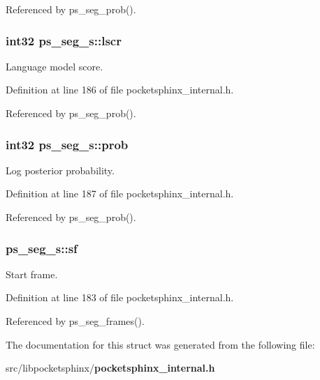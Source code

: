 Referenced by ps\-\_\-seg\-\_\-prob().

\subsubsection[{lscr}]{\setlength{\rightskip}{0pt plus 5cm}int32 ps\-\_\-seg\-\_\-s\-::lscr}\label{structps__seg__s_a69e605f422eeed1a9c67437e8ddd8b08}


Language model score. 



Definition at line 186 of file pocketsphinx\-\_\-internal.\-h.



Referenced by ps\-\_\-seg\-\_\-prob().

\subsubsection[{prob}]{\setlength{\rightskip}{0pt plus 5cm}int32 ps\-\_\-seg\-\_\-s\-::prob}\label{structps__seg__s_ae683244d90d0a5339930b47757778432}


Log posterior probability. 



Definition at line 187 of file pocketsphinx\-\_\-internal.\-h.



Referenced by ps\-\_\-seg\-\_\-prob().

\subsubsection[{sf}]{ ps\-\_\-seg\-\_\-s\-::sf}\label{structps__seg__s_a885a599726cd0efba573d106d016e6e2}


Start frame. 



Definition at line 183 of file pocketsphinx\-\_\-internal.\-h.



Referenced by ps\-\_\-seg\-\_\-frames().



The documentation for this struct was generated from the following file\-:\begin{DoxyCompactItemize}
\item 
src/libpocketsphinx/{\bf pocketsphinx\-\_\-internal.\-h}\end{DoxyCompactItemize}
